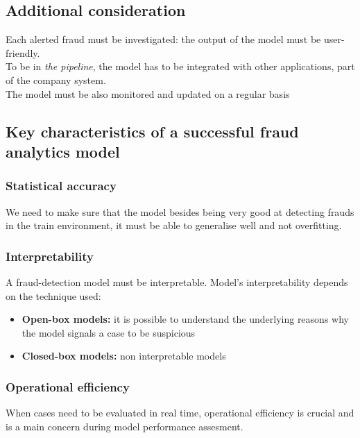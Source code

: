    \subsection{Additional consideration}
        Each alerted fraud must be investigated: the output of the model must be user-friendly.\\
        To be in \textit{the pipeline}, the model has to be integrated with other applications, part of the company system.\\
        The model must be also monitored and updated on a regular basis 
    \subsection{Key characteristics of a successful fraud analytics model}
        \subsubsection{Statistical accuracy}
            We need to make sure that the model besides being very good at detecting frauds in the train environment, it must be able to generalise well and not overfitting.
        \subsubsection{Interpretability}
            A fraud-detection model must be interpretable. Model's interpretability depends on the technique used:
            \begin{itemize}
                \item \textbf{Open-box models:} it is possible to understand the underlying reasons why the model signals a case to be suspicious
                \item \textbf{Closed-box models:} non interpretable models
            \end{itemize}
        \subsubsection{Operational efficiency}
            When cases need to be evaluated in real time, operational efficiency is crucial and is a main concern during model performance assesment.
